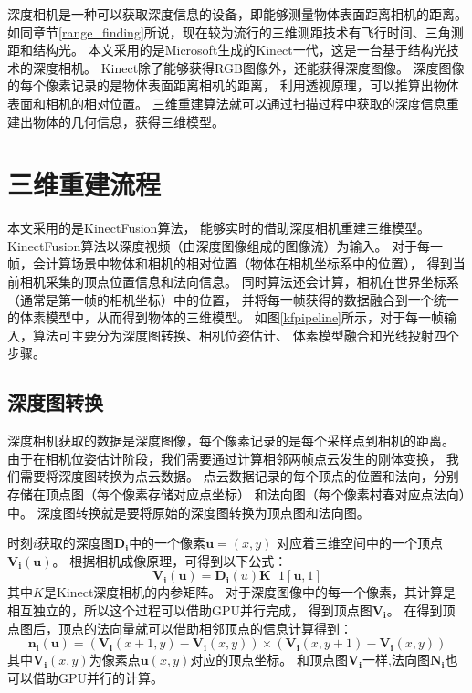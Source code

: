 深度相机是一种可以获取深度信息的设备，即能够测量物体表面距离相机的距离。
如同章节\ref{range_finding}所说，现在较为流行的三维测距技术有飞行时间、三角测距和结构光。
本文采用的是Microsoft生成的Kinect一代，这是一台基于结构光技术的深度相机。
Kinect除了能够获得RGB图像外，还能获得深度图像。
深度图像的每个像素记录的是物体表面距离相机的距离，
利用透视原理，可以推算出物体表面和相机的相对位置。
三维重建算法就可以通过扫描过程中获取的深度信息重建出物体的几何信息，获得三维模型。

\section{三维重建流程}
本文采用的是KinectFusion算法\cite{izadi2011kinectfusion}，
能够实时的借助深度相机重建三维模型。
KinectFusion算法\cite{izadi2011kinectfusion}以深度视频（由深度图像组成的图像流）为输入。
对于每一帧，会计算场景中物体和相机的相对位置（物体在相机坐标系中的位置），
得到当前相机采集的顶点位置信息和法向信息。
同时算法还会计算，相机在世界坐标系（通常是第一帧的相机坐标）中的位置，
并将每一帧获得的数据融合到一个统一的体素模型中，从而得到物体的三维模型。
如图\ref{kfpipeline}所示，对于每一帧输入，算法可主要分为深度图转换、相机位姿估计、
体素模型融合和光线投射四个步骤。

\subsection{深度图转换}
深度相机获取的数据是深度图像，每个像素记录的是每个采样点到相机的距离。
由于在相机位姿估计阶段，我们需要通过计算相邻两帧点云发生的刚体变换，
我们需要将深度图转换为点云数据。
点云数据记录的每个顶点的位置和法向，分别存储在顶点图（每个像素存储对应点坐标）
和法向图（每个像素村春对应点法向）中。
深度图转换就是要将原始的深度图转换为顶点图和法向图。

时刻$i$获取的深度图$\mathbf{D_i}$中的一个像素$\mathbf{u}=(x,y)$
对应着三维空间中的一个顶点$\mathbf{V_i}(\mathbf{u})$。
根据相机成像原理，可得到以下公式：
\begin{equation}
    \mathbf{V_i(u)}=\mathbf{D_i}(u)\mathbf{K}^-1[\mathbf{u},1]
\end{equation}
其中$K$是Kinect深度相机的内参矩阵。
对于深度图像中的每一个像素，其计算是相互独立的，所以这个过程可以借助GPU并行完成，
得到顶点图$\mathbf{V_i}$。
在得到顶点图后，顶点的法向量就可以借助相邻顶点的信息计算得到：
\begin{equation}
    \mathbf{n_i}(\mathbf{u})=(\mathbf{V_i}(x+1,y)-\mathbf{V_i}(x,y))\times(\mathbf{V_i}(x,y+1)-\mathbf{V_i}(x,y))
\end{equation}
其中$\mathbf{V_i}(x,y)$为像素点$\mathbf{u}(x,y)$对应的顶点坐标。
和顶点图$\mathbf{V_i}$一样,法向图$\mathbf{N_i}$也可以借助GPU并行的计算。

